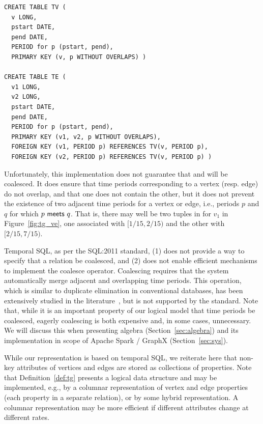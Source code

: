 \begin{small}
\begin{verbatim}
CREATE TABLE TV (
  v LONG,
  pstart DATE,
  pend DATE,
  PERIOD for p (pstart, pend),
  PRIMARY KEY (v, p WITHOUT OVERLAPS) )

CREATE TABLE TE (
  v1 LONG,
  v2 LONG,
  pstart DATE,
  pend DATE,
  PERIOD for p (pstart, pend),
  PRIMARY KEY (v1, v2, p WITHOUT OVERLAPS),
  FOREIGN KEY (v1, PERIOD p) REFERENCES TV(v, PERIOD p),
  FOREIGN KEY (v2, PERIOD p) REFERENCES TV(v, PERIOD p) )
\end{verbatim}
\end{small}

Unfortunately, this implementation does not guarantee that \tv and \te
will be coalesced.  It does ensure that time periods corresponding to
a vertex (resp. edge) do not overlap, and that one does not contain
the other, but it does not prevent the existence of two adjacent time
periods for a vertex or edge, i.e., periods $p$ and $q$ for which
$p~\mathsf{meets}~q$.  That is, there may well be two tuples in \tv
for $v_1$ in Figure~\ref{fig:tg_ve}, one associated with $[1/15,
  2/15)$ and the other with $[2/15, 7/15)$.

Temporal SQL, as per the SQL:2011 standard, (1) does not provide a way
to specify that a relation be coalesced, and (2) does not enable
efficient mechanisms to implement the coalesce operator.  Coalescing
requires that the system automatically merge adjacent and overlapping
time periods.  This operation, which is similar to duplicate
elimination in conventional databases, has been extensively studied in
the
literature~\cite{DBLP:conf/vldb/BohlenSS96,DBLP:journals/sigmod/Zimanyi06},
but is not supported by the standard.  Note that, while it is an
important property of our logical model that time periods be
coalesced, eagerly coalescing is both expensive and, in some cases,
unnecessary.  We will discuss this when presenting \tg algebra
(Section~\ref{sec:algebra}) and its implementation in scope of Apache
Spark / GraphX (Section~\ref{sec:sys}).

While our \ve representation is based on temporal SQL, we reiterate
here that non-key attributes of vertices and edges are stored as
collections of properties.  Note that Definition~\ref{def:tg}
presents a logical data structure and may be implemented, e.g., by a
columnar representation of vertex and edge properties (each property
in a separate relation), or by some hybrid representation.  A columnar
representation may be more efficient if different attributes change at
different rates.

